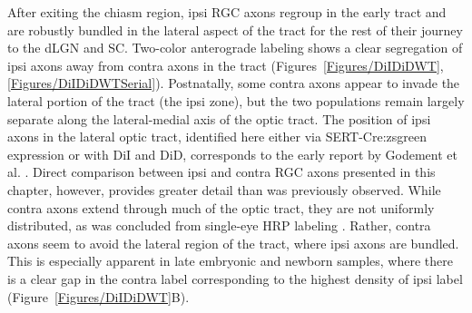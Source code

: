 After exiting the chiasm region, ipsi RGC axons regroup in the early tract and are robustly bundled in the lateral aspect of the tract for the rest of their journey to the dLGN and SC.
Two-color anterograde labeling shows a clear segregation of ipsi axons away from contra axons in the tract (Figures~\ref{Figures/DiIDiDWT}, \ref{Figures/DiIDiDWTSerial}).
Postnatally, some contra axons appear to invade the lateral portion of the tract (the ipsi zone), but the two populations remain largely separate along the lateral-medial axis of the optic tract.
The position of ipsi axons in the lateral optic tract, identified here either via SERT-Cre:zsgreen expression or with DiI and DiD, corresponds to the early report by Godement et al. .
Direct comparison between ipsi and contra RGC axons presented in this chapter, however, provides greater detail than was previously observed.
While contra axons extend through much of the optic tract, they are not uniformly distributed, as was concluded from single-eye HRP labeling \cite{godement1984prenatal}.
Rather, contra axons seem to avoid the lateral region of the tract, where ipsi axons are bundled.
This is especially apparent in late embryonic and newborn samples, where there is a clear gap in the contra label corresponding to the highest density of ipsi label (Figure~\ref{Figures/DiIDiDWT}B).

